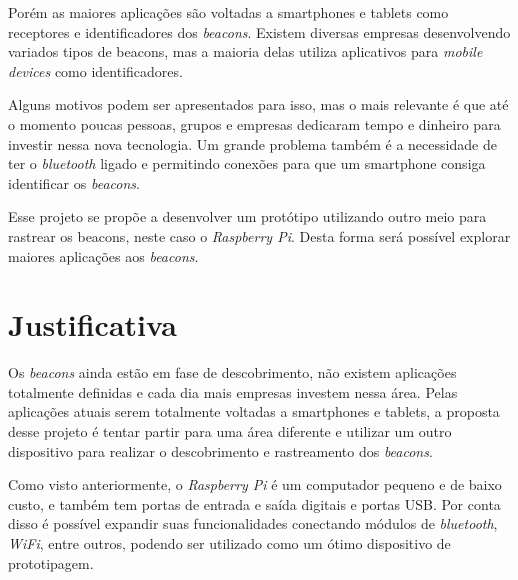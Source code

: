 \documentclass[
	12pt,				%
	openright,			%
	oneside,			%
	a4paper,			%
	chapter=TITLE,		%
	english,			%
	french,				%
	spanish,			%
	brazil				%
	]{abntex2}
\begin{document}
{Porém as maiores aplicações são voltadas a smartphones e tablets como receptores e identificadores dos \textit{beacons}. Existem diversas empresas desenvolvendo variados tipos de beacons, mas a maioria delas utiliza aplicativos para \textit{mobile devices} como identificadores. 

Alguns motivos podem ser apresentados para isso, mas o mais relevante é que até o momento poucas pessoas, grupos e empresas dedicaram tempo e dinheiro para investir nessa nova tecnologia. Um grande problema também é a necessidade de ter o \textit{bluetooth} ligado e permitindo conexões para que um smartphone consiga identificar os \textit{beacons}.

Esse projeto se propõe a desenvolver um protótipo utilizando outro meio para rastrear os beacons, neste caso o \textit{Raspberry Pi}. Desta forma será possível explorar maiores aplicações aos \textit{beacons}.




\chapter{Justificativa}

Os \textit{beacons} ainda estão em fase de descobrimento, não existem aplicações totalmente definidas e cada dia mais empresas investem nessa área. Pelas aplicações atuais serem totalmente voltadas a smartphones e tablets, a proposta desse projeto é tentar partir para uma área diferente e utilizar um outro dispositivo para realizar o descobrimento e rastreamento dos \textit{beacons}.

Como visto anteriormente, o \textit{Raspberry Pi} é um computador pequeno e de baixo custo, e também tem portas de entrada e saída digitais e portas USB. Por conta disso é possível expandir suas funcionalidades conectando módulos de \textit{bluetooth}, \textit{WiFi}, entre outros, podendo ser utilizado como um ótimo dispositivo de prototipagem.

		\begin{figure}[h!]
		\end{figure}

}
\end{document}
